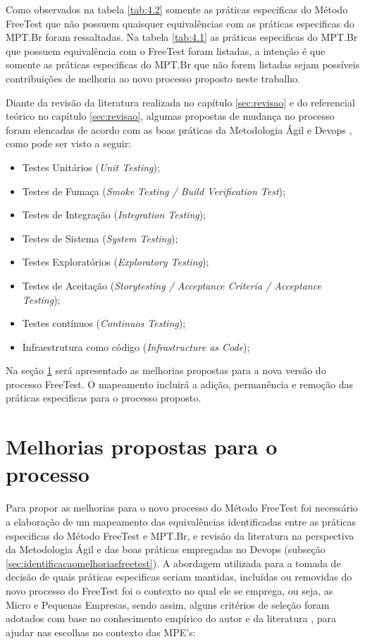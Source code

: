 Como observados na tabela \ref{tab:4.2} somente as práticas especificas do Método FreeTest que não possuem quaisquer equivalências com as práticas especificas do MPT.Br foram ressaltadas. Na tabela \ref{tab:4.1} as práticas especificas do MPT.Br que possuem equivalência com o FreeTest foram listadas, a intenção é que somente as práticas especificas do MPT.Br que não forem listadas sejam possíveis contribuições de melhoria ao novo processo proposto neste trabalho.

Diante da revisão da literatura realizada no capítulo \ref{sec:revisao} e do referencial teórico no capítulo \ref{sec:revisao}, algumas propostas de mudança no processo foram elencadas de acordo com as boas práticas da Metodologia Ágil \cite{Beck2001,Debois2008} e Devops \cite{Howlett,Fitzgerald2014,Erich2014}, como pode ser visto a seguir:

\begin{itemize}
    \item Testes Unitários (\textit{Unit Testing});
    \item Testes de Fumaça (\textit{Smoke Testing / Build Verification Test});
    \item Testes de Integração (\textit{Integration Testing});
    \item Testes de Sistema (\textit{System Testing});
    \item Testes Exploratórios (\textit{Exploratory Testing});
    \item Testes de Aceitação (\textit{Storytesting / Acceptance Criteria / Acceptance Testing});
    \item Testes contínuos (\textit{Continuos Testing});
    \item Infraestrutura como código (\textit{Infrastructure as Code})\cite{BRAGA2015};
\end{itemize}

Na seção \ref{sec:melhoriaspropostas} será apresentado as melhorias propostas para a nova versão do processo FreeTest. O mapeamento incluirá a adição, permanência e remoção das práticas especificas para o processo proposto.

\section{Melhorias propostas para o processo}
\label{sec:melhoriaspropostas}

Para propor as melhorias para o novo processo do Método FreeTest foi necessário a elaboração de um mapeamento das equivalências identificadas entre as práticas especificas do Método FreeTest e MPT.Br, e revisão da literatura na perspectiva da Metodologia Ágil e das boas práticas empregadas no Devops (subseção \ref{sec:identificacaomelhoriasfreetest}).
A abordagem utilizada para a tomada de decisão de quais práticas especificas seriam mantidas, incluídas ou removidas do novo processo do FreeTest foi o contexto no qual ele se emprega, ou seja, as Micro e Pequenas Empresas, sendo assim, alguns critérios de seleção foram adotados com base no conhecimento empírico do autor e da literatura \cite{JamesWhittakerJasonCarollo2012, Especialistas2015, Whittaker2009, ABESSofftware2014, FelipeDreher2016, Laporte2010, Ramachandram2008, SilvaDias2015}, para ajudar nas escolhas no contexto das MPE's:

